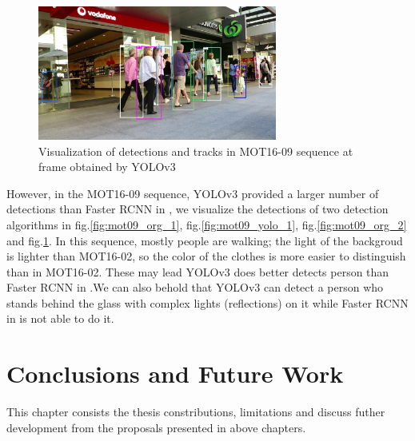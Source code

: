 \begin{figure}[h!]
    \centering
    \includegraphics[width=0.7\textwidth]{Chapters/Fig/mot09_yolo_2.jpg}
    \caption{Visualization of detections and tracks in MOT16-09 sequence at frame obtained by YOLOv3}
    \label{fig:mot09_yolo_2}
\end{figure}\par
However, in the MOT16-09 sequence, YOLOv3\cite{yolov3} provided a larger number
of detections than Faster RCNN in \cite{Wojke2017simple}, we visualize the detections of two detection algorithms in fig.\ref{fig:mot09_org_1},
fig.\ref{fig:mot09_yolo_1}, fig.\ref{fig:mot09_org_2} and fig.\ref{fig:mot09_yolo_2}. In this sequence, mostly people are walking; 
the light of the backgroud is lighter than MOT16-02, so the color of the clothes is more easier to distinguish than in MOT16-02. These may 
lead YOLOv3 \cite{yolov3} does better detects person than Faster RCNN in \cite{Wojke2017simple}.We can also behold that YOLOv3\cite{yolov3}
can detect a person who stands behind the glass with complex lights (reflections) on it while Faster RCNN in \cite{Wojke2017simple}
is not able to do it. 

\chapter{Conclusions and Future Work}
This chapter consists the thesis constributions, limitations and discuss futher development from the proposals presented in above chapters.
